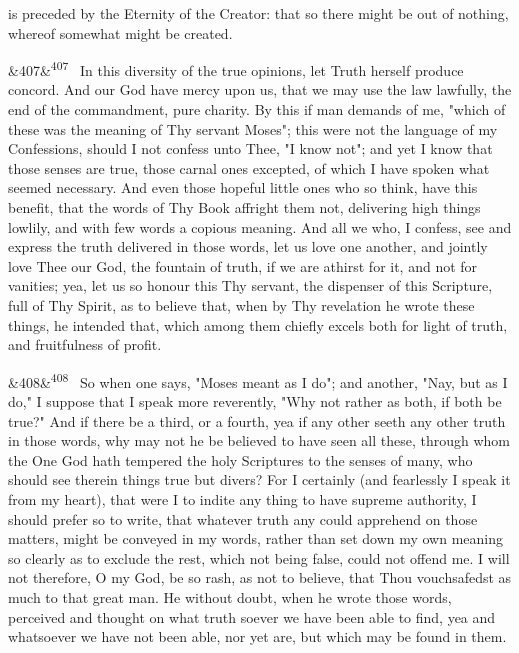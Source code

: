\documentclass[12pt]{article}
\newcommand{\para}[1][]{\par\noindent\ifx&#1&\else\textsuperscript{\footnotesize #1}~\fi}
\begin{document}
is preceded by the Eternity of the Creator: that so there might be out of nothing, whereof somewhat might be created.

\para[407] In this diversity of the true opinions, let Truth herself produce concord. And our God have mercy upon us, that we may use the law lawfully, the end of the commandment, pure charity. By this if man demands of me, "which of these was the meaning of Thy servant Moses"; this were not the language of my Confessions, should I not confess unto Thee, "I know not"; and yet I know that those senses are true, those carnal ones excepted, of which I have spoken what seemed necessary. And even those hopeful little ones who so think, have this benefit, that the words of Thy Book affright them not, delivering high things lowlily, and with few words a copious meaning. And all we who, I confess, see and express the truth delivered in those words, let us love one another, and jointly love Thee our God, the fountain of truth, if we are athirst for it, and not for vanities; yea, let us so honour this Thy servant, the dispenser of this Scripture, full of Thy Spirit, as to believe that, when by Thy revelation he wrote these things, he intended that, which among them chiefly excels both for light of truth, and fruitfulness of profit.

\para[408] So when one says, "Moses meant as I do"; and another, "Nay, but as I do," I suppose that I speak more reverently, "Why not rather as both, if both be true?" And if there be a third, or a fourth, yea if any other seeth any other truth in those words, why may not he be believed to have seen all these, through whom the One God hath tempered the holy Scriptures to the senses of many, who should see therein things true but divers? For I certainly (and fearlessly I speak it from my heart), that were I to indite any thing to have supreme authority, I should prefer so to write, that whatever truth any could apprehend on those matters, might be conveyed in my words, rather than set down my own meaning so clearly as to exclude the rest, which not being false, could not offend me. I will not therefore, O my God, be so rash, as not to believe, that Thou vouchsafedst as much to that great man. He without doubt, when he wrote those words, perceived and thought on what truth soever we have been able to find, yea and whatsoever we have not been able, nor yet are, but which may be found in them.
\end{document}
